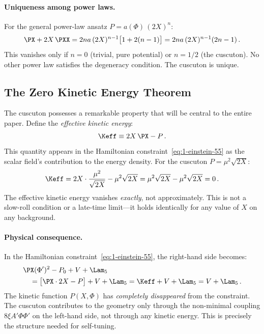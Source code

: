 \paragraph{Uniqueness among power laws.} For the general power-law ansatz $P = a(\Phi)\,(2X)^n$:
\begin{equation}
\label{eq:1-uniqueness}
\PX + 2X\,\PXX = 2na\,(2X)^{n-1}\bigl[1 + 2(n-1)\bigr] = 2na\,(2X)^{n-1}(2n-1)\,.
\end{equation}
This vanishes only if $n = 0$ (trivial, pure potential) or $n = 1/2$ (the cuscuton). No other power law satisfies the degeneracy condition. The cuscuton is unique.

\subsection{The Zero Kinetic Energy Theorem}
\label{sec:1-zke}

The cuscuton possesses a remarkable property that will be central to the entire paper. Define the \emph{effective kinetic energy}:
\begin{equation}
\label{eq:1-keff-def}
\Keff \equiv 2X\,\PX - P\,.
\end{equation}
This quantity appears in the Hamiltonian constraint~\eqref{eq:1-einstein-55} as the scalar field's contribution to the energy density. For the cuscuton $P = \mu^2\sqrt{2X}$:
\begin{equation}
\label{eq:1-keff-zero}
\Keff = 2X \cdot \frac{\mu^2}{\sqrt{2X}} - \mu^2\sqrt{2X}
= \mu^2\sqrt{2X} - \mu^2\sqrt{2X} = 0\,.
\end{equation}
The effective kinetic energy vanishes \emph{exactly}, not approximately. This is not a slow-roll condition or a late-time limit---it holds identically for any value of $X$ on any background.

\paragraph{Physical consequence.} In the Hamiltonian constraint~\eqref{eq:1-einstein-55}, the right-hand side becomes:
\begin{align}
\label{eq:1-rhs-simplify}
&\PX(\Phi')^2 - P_0 + V + \Lam_5
\notag\\
&\quad = \bigl[\PX \cdot 2X - P\bigr] + V + \Lam_5
= \Keff + V + \Lam_5 = V + \Lam_5\,.
\end{align}
The kinetic function $P(X, \Phi)$ has \emph{completely disappeared} from the constraint. The cuscuton contributes to the geometry only through the non-minimal coupling $8\xi A'\Phi\Phi'$ on the left-hand side, not through any kinetic energy. This is precisely the structure needed for self-tuning.

